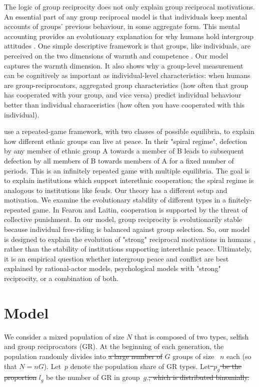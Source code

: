 \documentclass[12pt,a4paper]{article}
\newcommand{\mm}[1]{{\color{red} #1}}
\begin{document}
The logic of group reciprocity does not only explain group reciprocal motivations.
An essential part of any group reciprocal model is that individuals keep mental 
accounts of groups' previous behaviour, in some aggregate form. This mental
accounting provides an evolutionary explanation for why humans hold intergroup 
attitudes \parencite{brewer1985psychology,kurzban2001can}. One simple descriptive 
framework is that groups, like individuals, are perceived on the two dimensions of
warmth and competence \parencite{fiske2007universal}. Our model captures
the warmth dimension. It also shows why a group-level measurement can be cognitively
as important as individual-level characteristics: when humans are group-reciprocators,
aggregated group characteristics (how often that group has cooperated
with your group, and vice versa) predict individual behaviour better than individual
characeristics (how often you have cooperated with this individual).

\textcite{fearon1996explaining} use a repeated-game framework, with 
two classes of possible equilibria, to explain how
different ethnic groups can live at peace. In their "spiral regime", defection
by any member of ethnic group A towards a member of B leads to subsequent 
defection by all members of B towards members of A for a fixed number of periods.
This is an infinitely repeated game with multiple equilibria. The goal is to explain
institutions which support interethnic cooperation; the spiral regime is analogous
to institutions like feuds. Our theory has a different setup and motivation. 
We examine the evolutionary stability of different types in a finitely-repeated game. 
In Fearon and Laitin, cooperation is supported by the threat of collective 
punishment. In our model, group reciprocity is evolutionarily stable because 
individual free-riding is balanced against group selection. So, our model
is designed to explain the evolution of "strong" reciprocal
motivations in humans \parencite{gintis2000strong}, rather than the 
stability of institutions supporting interethnic peace. Ultimately, it is an 
empirical question whether intergroup peace and conflict are best explained 
by rational-actor models, psychological models with "strong" reciprocity,
or a combination of both.

\section{Model}

We consider a mixed population of \mm{size $N$ that is composed of }two types, selfish and group reciprocators (GR). At the beginning of each generation, the population randomly divides into \sout{a large number of} \mm{$G$} groups of size~\mm{$n$} each \mm{(so that $N=nG$)}.
Let~$p$ denote the population share of GR types. 
Let\sout{~$p_g$ be the proportion} \mm{$l_g$ be the number} of GR in group~$g$.\sout{, which is distributed binomially.}
\end{document}
